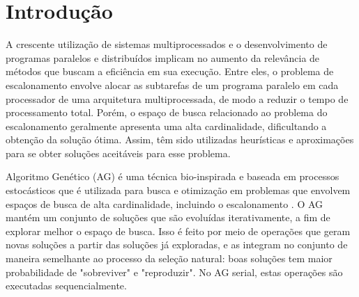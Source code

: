 \documentclass[fleqn,10pt]{SelfArx} %
\affiliation{
\textit{Faculdade de Computação, Universidade Federal de Uberlândia, Brasil}}
\affiliation{*\textbf{Corresponding author}: brunowelldm@gmail.com}
\begin{document}
\setcounter{page}{11}

\flushbottom %
\maketitle %
\thispagestyle{empty} %







\section{Introdução} %

A crescente utilização de sistemas multiprocessados e o desenvolvimento de programas paralelos e distribuídos implicam no aumento da relevância de métodos que buscam a eficiência em sua execução. Entre eles, o problema de escalonamento envolve alocar as subtarefas de um programa paralelo em cada processador de uma arquitetura multiprocessada, de modo a reduzir o tempo de processamento total. Porém, o espaço de busca relacionado ao problema do escalonamento geralmente apresenta uma alta cardinalidade, dificultando a obtenção da solução ótima. Assim, têm sido utilizadas heurísticas e aproximações para se obter soluções aceitáveis para esse problema. \cite{Hou1994}

Algoritmo Genético (AG) é uma técnica bio-inspirada e baseada em processos estocásticos que é utilizada para busca e otimização em problemas que envolvem espaços de busca de alta cardinalidade, incluindo o escalonamento \cite{Goldberg:1989:GAS:534133}. O AG mantém um conjunto de soluções que são evoluídas iterativamente, a fim de explorar melhor o espaço de busca. Isso é feito por meio de operações que geram novas soluções a partir das soluções já exploradas, e as integram no conjunto de maneira semelhante ao processo da seleção natural: boas soluções tem maior probabilidade de "sobreviver" e "reproduzir". No AG serial, estas operações são executadas sequencialmente.
\end{document}
